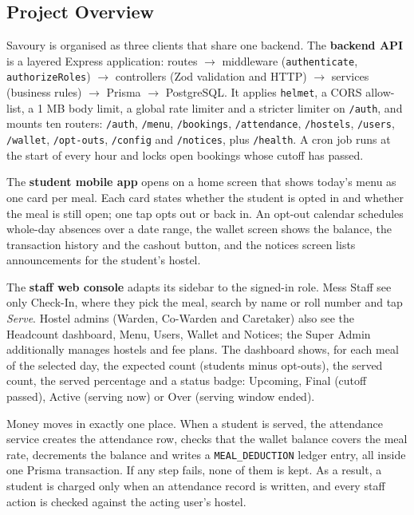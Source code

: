 \documentclass[11pt,a4paper]{article}
\begin{document}
\subsection{Project Overview}

Savoury is organised as three clients that share one backend. The
\textbf{backend API} is a layered Express application:
routes $\rightarrow$ middleware (\texttt{authenticate}, \texttt{authorizeRoles})
$\rightarrow$ controllers (Zod validation and HTTP) $\rightarrow$ services
(business rules) $\rightarrow$ Prisma $\rightarrow$ PostgreSQL. It applies
\texttt{helmet}, a CORS allow-list, a 1 MB body limit, a global rate limiter and
a stricter limiter on \texttt{/auth}, and mounts ten routers:
\texttt{/auth}, \texttt{/menu}, \texttt{/bookings}, \texttt{/attendance},
\texttt{/hostels}, \texttt{/users}, \texttt{/wallet}, \texttt{/opt-outs},
\texttt{/config} and \texttt{/notices}, plus \texttt{/health}. A cron job runs
at the start of every hour and locks open bookings whose cutoff has passed.

The \textbf{student mobile app} opens on a home screen that shows today's menu
as one card per meal. Each card states whether the student is opted in and
whether the meal is still open; one tap opts out or back in. An opt-out
calendar schedules whole-day absences over a date range, the wallet screen
shows the balance, the transaction history and the cashout button, and the
notices screen lists announcements for the student's hostel.

The \textbf{staff web console} adapts its sidebar to the signed-in role. Mess
Staff see only Check-In, where they pick the meal, search by name or roll number
and tap \emph{Serve}. Hostel admins (Warden, Co-Warden and Caretaker) also see
the Headcount dashboard, Menu, Users, Wallet and Notices; the Super Admin
additionally manages hostels and fee plans. The dashboard shows, for each meal of
the selected day, the expected count (students minus opt-outs), the served count,
the served percentage and a status badge: Upcoming, Final (cutoff passed),
Active (serving now) or Over (serving window ended).

Money moves in exactly one place. When a student is served, the attendance
service creates the attendance row, checks that the wallet balance covers the
meal rate, decrements the balance and writes a \texttt{MEAL\_DEDUCTION} ledger
entry, all inside one Prisma transaction. If any step fails, none of them is
kept. As a result, a student is charged only when an attendance record is
written, and every staff action is checked against the acting user's hostel.
\end{document}
